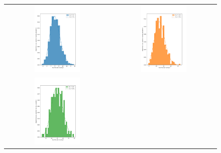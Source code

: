 \documentclass[12pt,a4paper]{article}
\begin{document}
\newpage

\begin{figure}[!ht]
\begin{tabular}{cc}
{\includegraphics[width=0.45\textwidth]{imgs/5.png}} &
{\includegraphics[width=0.45\textwidth]{imgs/10.png}} \\
{\includegraphics[width=0.45\textwidth]{imgs/20.png}} &

\end{tabular}
\end{figure}
\end{document}
